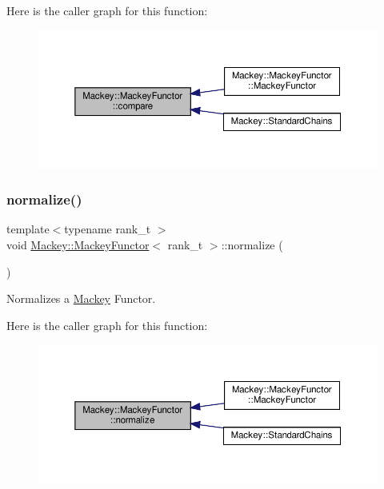 Here is the caller graph for this function\+:\nopagebreak
\begin{figure}[H]
\begin{center}
\leavevmode
\includegraphics[width=350pt]{classMackey_1_1MackeyFunctor_a334a91a445ac86cc5cce53b29efd6df1_icgraph}
\end{center}
\end{figure}
\mbox{\label{classMackey_1_1MackeyFunctor_ae63fdf151f6ee653d6cb50d442948e30}} 
\subsubsection{\texorpdfstring{normalize()}{normalize()}}
{\footnotesize\ttfamily template$<$typename rank\+\_\+t $>$ \\
void \hyperlink{classMackey_1_1MackeyFunctor}{Mackey\+::\+Mackey\+Functor}$<$ rank\+\_\+t $>$\+::normalize (\begin{DoxyParamCaption}{ }\end{DoxyParamCaption})}



Normalizes a \hyperlink{namespaceMackey}{Mackey} Functor. 

Here is the caller graph for this function\+:\nopagebreak
\begin{figure}[H]
\begin{center}
\leavevmode
\includegraphics[width=350pt]{classMackey_1_1MackeyFunctor_ae63fdf151f6ee653d6cb50d442948e30_icgraph}
\end{center}
\end{figure}
\mbox{\label{classMackey_1_1MackeyFunctor_a44d3104a47f23de5d8141b7800db6d11}} 
